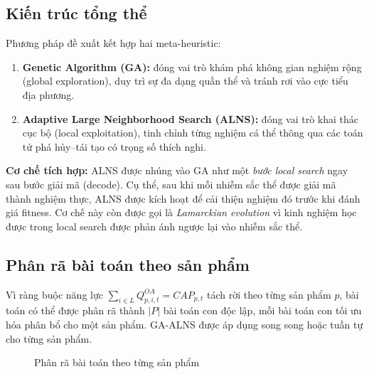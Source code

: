 \documentclass[12pt]{article}
\newcommand{\QOA}{Q^{OA}}
\begin{document}
\subsection{Kiến trúc tổng thể}

Phương pháp đề xuất kết hợp hai meta-heuristic:

\begin{enumerate}
  \item \textbf{Genetic Algorithm (GA):} đóng vai trò khám phá không gian nghiệm rộng (global exploration), duy trì sự đa dạng quần thể và tránh rơi vào cực tiểu địa phương.
  \item \textbf{Adaptive Large Neighborhood Search (ALNS):} đóng vai trò khai thác cục bộ (local exploitation), tinh chỉnh từng nghiệm cá thể thông qua các toán tử phá hủy--tái tạo có trọng số thích nghi.
\end{enumerate}

\medskip

\noindent\textbf{Cơ chế tích hợp:} ALNS được nhúng vào GA như một \emph{bước local search} ngay sau bước giải mã (decode). Cụ thể, sau khi mỗi nhiễm sắc thể được giải mã thành nghiệm thực, ALNS được kích hoạt để cải thiện nghiệm đó trước khi đánh giá fitness. Cơ chế này còn được gọi là \emph{Lamarckian evolution} vì kinh nghiệm học được trong local search được phản ánh ngược lại vào nhiễm sắc thể.

\subsection{Phân rã bài toán theo sản phẩm}

Vì ràng buộc năng lực $\sum_{i \in L} \QOA_{p,i,t} = CAP_{p,t}$ tách rời theo từng sản phẩm $p$, bài toán có thể được phân rã thành $|P|$ bài toán con độc lập, mỗi bài toán con tối ưu hóa phân bổ cho một sản phẩm. GA-ALNS được áp dụng song song hoặc tuần tự cho từng sản phẩm.

\begin{figure}[H]
\centering
{}
\caption{Phân rã bài toán theo từng sản phẩm}
\end{figure}
\end{document}

